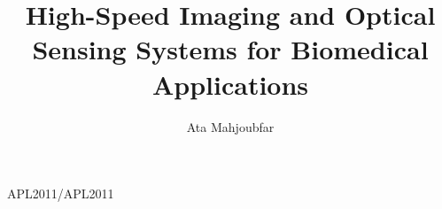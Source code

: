 \documentclass [PhD] {uclathes}
\title          {High-Speed Imaging and Optical Sensing Systems for Biomedical Applications}
\author         {Ata Mahjoubfar}
\begin{document}
\makeintropages

%
%
 {APL2011/APL2011}                         %





\end{document}
